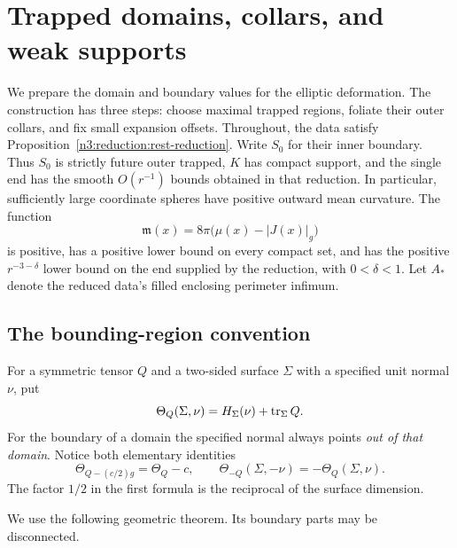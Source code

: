 \section{Trapped domains, collars, and weak supports}
\label{n3:domains:section}

We prepare the domain and boundary values for the elliptic deformation.
The construction has three steps: choose maximal trapped regions,
foliate their outer collars, and fix small expansion offsets.
Throughout, the data satisfy
Proposition~\ref{n3:reduction:rest-reduction}.  Write $S_0$ for their inner
boundary.  Thus $S_0$ is strictly future outer trapped, $K$ has compact
support, and the single end has the smooth $O(r^{-1})$ bounds obtained in
that reduction.  In particular, sufficiently large coordinate spheres
have positive outward mean curvature.  The function
\begin{equation}\label{n3:domains:margin}
 \mathfrak m(x)=8\pi\bigl(\mu(x)-|J(x)|_g\bigr)
\end{equation}
is positive, has a positive lower bound on every compact set, and has
the positive $r^{-3-\delta}$ lower bound on the end supplied by the
reduction, with $0<\delta<1$.  Let $A_*$ denote the reduced data's
filled enclosing perimeter infimum.

\subsection{The bounding-region convention}

For a symmetric tensor $Q$ and a two-sided surface $\Sigma$ with a
specified unit normal $\nu$, put
\begin{equation}\label{n3:domains:expansion}
 \Theta_Q(\Sigma,\nu)
   =H_\Sigma(\nu)+\operatorname{tr}_\Sigma Q.
\end{equation}
For the boundary of a domain the specified normal always points
\emph{out of that domain}.  Notice both elementary identities
\begin{equation}\label{n3:domains:shift-reversal}
 \Theta_{Q-(c/2)g}=\Theta_Q-c,
 \qquad
 \Theta_{-Q}(\Sigma,-\nu)=-\Theta_Q(\Sigma,\nu).
\end{equation}
The factor $1/2$ in the first formula is the reciprocal of the surface
dimension.

We use the following geometric theorem.  Its boundary parts may be
disconnected.

